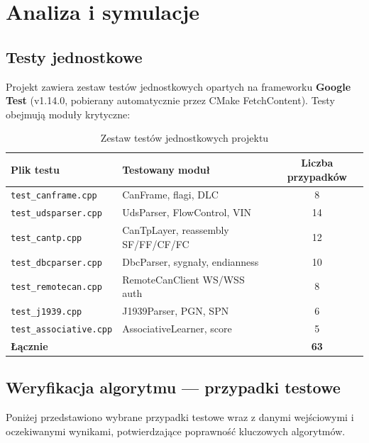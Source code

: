 \documentclass[12pt, a4paper]{article}
\begin{document}
\section{Analiza i symulacje}

\subsection{Testy jednostkowe}

Projekt zawiera zestaw testów jednostkowych opartych na frameworku
\textbf{Google Test} (v1.14.0, pobierany automatycznie przez CMake FetchContent).
Testy obejmują moduły krytyczne:

\begin{table}[H]
\caption{Zestaw testów jednostkowych projektu}
\label{tab:tests}
\centering
\small
\begin{tabular}{llc}
\toprule
\textbf{Plik testu} & \textbf{Testowany moduł} & \textbf{Liczba przypadków} \\
\midrule
\texttt{test\_canframe.cpp}     & CanFrame, flagi, DLC          & 8  \\
\texttt{test\_udsparser.cpp}    & UdsParser, FlowControl, VIN   & 14 \\
\texttt{test\_cantp.cpp}        & CanTpLayer, reassembly SF/FF/CF/FC & 12 \\
\texttt{test\_dbcparser.cpp}    & DbcParser, sygnały, endianness & 10 \\
\texttt{test\_remotecan.cpp}    & RemoteCanClient WS/WSS auth   & 8  \\
\texttt{test\_j1939.cpp}        & J1939Parser, PGN, SPN         & 6  \\
\texttt{test\_associative.cpp}  & AssociativeLearner, score     & 5  \\
\midrule
\textbf{Łącznie}               &                               & \textbf{63} \\
\bottomrule
\end{tabular}
\end{table}

\subsection{Weryfikacja algorytmu --- przypadki testowe}

Poniżej przedstawiono wybrane przypadki testowe wraz z danymi wejściowymi
i oczekiwanymi wynikami, potwierdzające poprawność kluczowych algorytmów.
\end{document}
